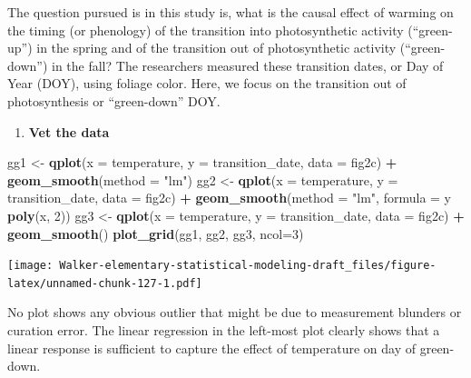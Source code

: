 \documentclass[]{book}
\newenvironment{Shaded}{\begin{snugshade}}{\end{snugshade}}
\newcommand{\DataTypeTok}[1]{\textcolor[rgb]{0.13,0.29,0.53}{#1}}
\newcommand{\DecValTok}[1]{\textcolor[rgb]{0.00,0.00,0.81}{#1}}
\newcommand{\KeywordTok}[1]{\textcolor[rgb]{0.13,0.29,0.53}{\textbf{#1}}}
\newcommand{\NormalTok}[1]{#1}
\newcommand{\OperatorTok}[1]{\textcolor[rgb]{0.81,0.36,0.00}{\textbf{#1}}}
\newcommand{\StringTok}[1]{\textcolor[rgb]{0.31,0.60,0.02}{#1}}
\providecommand{\tightlist}{%
  \setlength{\itemsep}{0pt}\setlength{\parskip}{0pt}}
\begin{document}
The question pursued is in this study is, what is the causal effect of warming on the timing (or phenology) of the transition into photosynthetic activity (``green-up'') in the spring and of the transition out of photosynthetic activity (``green-down'') in the fall? The researchers measured these transition dates, or Day of Year (DOY), using foliage color. Here, we focus on the transition out of photosynthesis or ``green-down'' DOY.

\begin{enumerate}
\def\labelenumi{\arabic{enumi}.}
\tightlist
\item
  \textbf{Vet the data}
\end{enumerate}

\begin{Shaded}
\begin{Highlighting}[]
\NormalTok{gg1 <-}\StringTok{ }\KeywordTok{qplot}\NormalTok{(}\DataTypeTok{x =}\NormalTok{ temperature,}
      \DataTypeTok{y =}\NormalTok{ transition_date,}
      \DataTypeTok{data =}\NormalTok{ fig2c) }\OperatorTok{+}
\StringTok{  }\KeywordTok{geom_smooth}\NormalTok{(}\DataTypeTok{method =} \StringTok{"lm"}\NormalTok{)}
\NormalTok{gg2 <-}\StringTok{ }\KeywordTok{qplot}\NormalTok{(}\DataTypeTok{x =}\NormalTok{ temperature,}
      \DataTypeTok{y =}\NormalTok{ transition_date,}
      \DataTypeTok{data =}\NormalTok{ fig2c) }\OperatorTok{+}
\StringTok{  }\KeywordTok{geom_smooth}\NormalTok{(}\DataTypeTok{method =} \StringTok{"lm"}\NormalTok{, }\DataTypeTok{formula =}\NormalTok{ y }\OperatorTok{~}\StringTok{ }\KeywordTok{poly}\NormalTok{(x, }\DecValTok{2}\NormalTok{))}
\NormalTok{gg3 <-}\StringTok{ }\KeywordTok{qplot}\NormalTok{(}\DataTypeTok{x =}\NormalTok{ temperature,}
      \DataTypeTok{y =}\NormalTok{ transition_date,}
      \DataTypeTok{data =}\NormalTok{ fig2c) }\OperatorTok{+}
\StringTok{  }\KeywordTok{geom_smooth}\NormalTok{()}
\KeywordTok{plot_grid}\NormalTok{(gg1, gg2, gg3, }\DataTypeTok{ncol=}\DecValTok{3}\NormalTok{)}
\end{Highlighting}
\end{Shaded}

\texttt{[image: Walker-elementary-statistical-modeling-draft\_files/figure-latex/unnamed-chunk-127-1.pdf]}

No plot shows any obvious outlier that might be due to measurement blunders or curation error. The linear regression in the left-most plot clearly shows that a linear response is sufficient to capture the effect of temperature on day of green-down.
\end{document}
